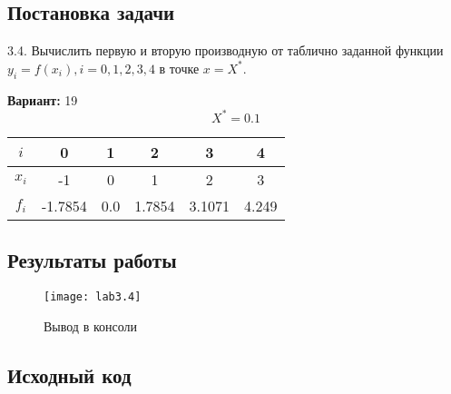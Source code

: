 \subsection{Постановка задачи}
3.4. Вычислить первую и вторую производную от таблично заданной функции $y_i = f(x_i), i = 0,1,2,3,4$ в точке $x= X^*$.  

{\bfseries Вариант:} 19
    \begin{equation}
		X^*=0.1
    \end{equation}
    \begin{center}
        \begin{tabular}{ |c|c|c|c|c|c| } 
			 \hline
			 $i$ & 0 & 1 & 2 & 3 & 4 \\ 
			 \hline
			 $x_i$ & -1 & 0 & 1 & 2 & 3 \\ 
			 \hline
			 $f_i$ & -1.7854 & 0.0 & 1.7854 & 3.1071 & 4.249 \\ 
			 \hline
        \end{tabular}
    \end{center}
\pagebreak

\subsection{Результаты работы}
\begin{figure}[h!]
\centering
\texttt{[image: lab3.4]}
\caption{Вывод в консоли}
\end{figure}


\subsection{Исходный код}

\pagebreak

